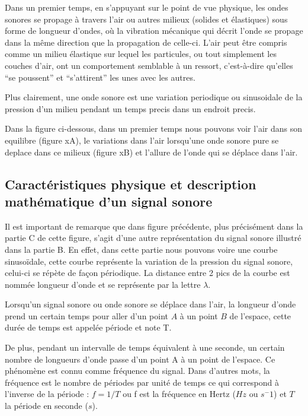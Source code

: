 \documentclass[conference,onecolumn]{IEEEtran}
\begin{document}
Dans un premier temps, en s’appuyant sur le point de vue physique, les ondes sonores se propage à travers l’air ou autres milieux (solides et élastiques) sous forme de longueur d’ondes, où la vibration mécanique qui décrit l’onde se propage dans la même direction que la propagation de celle-ci. L’air peut être compris comme un milieu élastique sur lequel les particules, ou tout simplement les couches d’air, ont un comportement semblable à un ressort, c’est-à-dire qu’elles “se poussent” et “s’attirent” les unes avec les autres. 

Plus clairement, une onde sonore est une variation periodique ou sinusoidale de la pression d’un milieu pendant un temps precis dans un endroit precis. 

Dans la figure ci-dessous, dans un premier temps nous pouvons voir l’air dans son equilibre (figure xA), le variations dans l’air lorsqu’une onde sonore pure se deplace dans ce milieux (figure xB) et l’allure de  l’onde qui se déplace dans l’air.


\subsection{Caractéristiques physique et description mathématique d’un signal sonore }

Il est important de remarque que dans figure précédente, plus précisément dans la partie C de cette figure, s’agit d’une autre représentation du signal sonore illustré dans la partie B. En effet, dans cette partie nous pouvons voire une courbe sinusoïdale, cette courbe représente la variation de la pression du signal sonore, celui-ci se répète de façon périodique. La distance entre 2 pics de la courbe est nommée longueur d’onde et se représente par la lettre $\lambda$. 

Lorsqu’un signal sonore ou onde sonore se déplace dans l’air, la longueur d’onde prend un certain temps pour aller d’un point $A$ à un point $B$ de l’espace, cette durée de temps est appelée période et note T. 

De plus, pendant un intervalle de temps équivalent à une seconde, un certain nombre de longueurs d’onde passe d’un point A à un point de l’espace. Ce phénomène est connu comme fréquence du signal. Dans d’autres mots, la fréquence est le nombre de périodes par unité de temps ce qui correspond à l’inverse de la période : $f=1/T$ ou f est la fréquence en Hertz ($Hz$ ou $s^-1$) et $T$ la période en seconde ($s$). 
\end{document}
